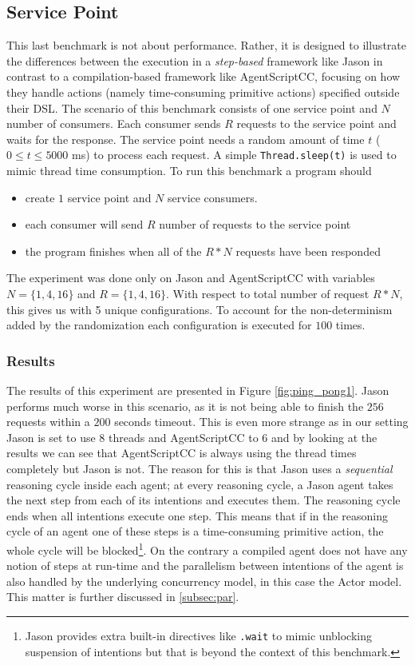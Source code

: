 \subsection{Service Point}
This last benchmark is not about performance. Rather, it is designed to illustrate the differences between the execution in a \textit{step-based} framework like Jason in contrast to a compilation-based framework like AgentScriptCC, focusing on how they handle actions (namely time-consuming primitive actions) specified outside their DSL. The scenario of this benchmark consists of one service point and $N$ number of consumers. Each consumer sends $R$ requests to the service point and waits for the response. The service point needs a random  amount of time $t$ ($0 \le t \le 5000$ ms) to process each request. A simple \verb+Thread.sleep(t)+ is used to mimic thread time consumption. To run this benchmark a program should
\begin{itemize}
    \item create $1$ service point and $N$ service consumers.
    \item each consumer will send $R$ number of requests to the service point
    \item the program finishes when all of the $R*N$ requests have been responded 
\end{itemize}
The experiment was done only on Jason and AgentScriptCC with variables $N=\{1,4,16\}$ and $R=\{1,4,16\}$. With respect to total number of request $R*N$, this gives us with 5 unique configurations. To account for the non-determinism added by the randomization each configuration is executed for $100$ times.

\subsubsection{Results}
The results of this experiment are presented in Figure \ref{fig:ping_pong1}. Jason performs much worse in this scenario, as it is not being able to finish the $256$ requests within a $200$ seconds timeout. This is even more strange as in our setting Jason is set to use $8$ threads and AgentScriptCC to $6$ and by looking at the results we can see that AgentScriptCC is always using the thread times completely but Jason is not. The reason for this is that Jason uses a \textit{sequential} reasoning cycle inside each agent; %
at every reasoning cycle, a Jason agent takes the next step from each of its intentions and executes them. The reasoning cycle ends when all intentions execute one step. This means that if in the reasoning cycle of an agent one of these steps is a time-consuming primitive action, the whole cycle will be blocked\footnote{Jason provides extra built-in directives like \texttt{.wait} to mimic unblocking suspension of intentions but that is beyond the context of this benchmark.}. On the contrary a compiled agent does not have any notion of steps at run-time and the parallelism between intentions of the agent is also handled by the underlying concurrency model, in this case the Actor model. This matter is further discussed in \ref{subsec:par}.


